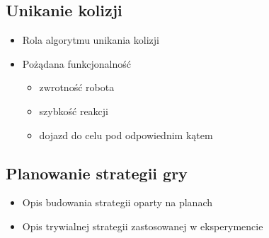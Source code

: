 		\subsection{Unikanie kolizji}
		\begin{itemize}
		 \item  Rola algorytmu unikania kolizji
		 \item  Pożądana funkcjonalność
			\begin{itemize}
			 \item zwrotność robota
			 \item szybkość reakcji
			 \item dojazd do celu pod odpowiednim kątem
			\end{itemize}
		\end{itemize}

		\subsection{Planowanie strategii gry}
		\begin{itemize}
		\item  Opis budowania strategii oparty na planach
		\item  Opis trywialnej strategii zastosowanej w eksperymencie
		\end{itemize}

